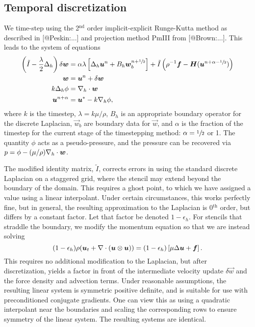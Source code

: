 \subsection{Temporal discretization}

We time-step using the 2$^\text{nd}$ order implicit-explicit Runge-Kutta method
as described in [@Peskin:...] and projection method PmIII from [@Brown:...].
This leads to the system of equations
\begin{align}
    \left(\tilde{I}-\frac{\lambda}2\Delta_h\right)\delta\boldsymbol{w}
    &= \alpha\lambda\left[\Delta_h\boldsymbol{u}^n + B_h \boldsymbol{w}_b^{n+\sfrac12}\right] + \tilde{I}\left(\rho^{-1}\boldsymbol{f} - \boldsymbol{H}(\boldsymbol{u}^{n+\alpha-\sfrac12})\right) \\
    \boldsymbol{w} &= \boldsymbol{u}^n + \delta\boldsymbol{w} \\
    k\Delta_h\phi &= \nabla_h\cdot\boldsymbol{w} \\
    \boldsymbol{u}^{n+\alpha} &= \boldsymbol{u}^\ast - k\nabla_h\phi,
\end{align}
where $k$ is the timestep, $\lambda = k\mu/\rho$, $B_h$ is an appropriate
boundary operator for the discrete Laplacian, $\vec{w}_b$ are boundary data for
$\vec{w}$, and $\alpha$ is the fraction of the timestep for the current stage
of the timestepping method: $\alpha=\sfrac12$ or 1. The quantity $\phi$ acts as
a pseudo-pressure, and the pressure can be recovered via
$p=\phi-(\mu/\rho)\nabla_h\cdot\boldsymbol{w}$.

The modified identity matrix, $\tilde{I}$, corrects errors in using the
standard discrete Laplacian on a staggered grid, where the stencil may extend
beyond the boundary of the domain. This requires a ghost point, to which we
have assigned a value using a linear interpolant. Under certain circumstances,
this works perfectly fine, but in general, the resulting approximation to the
Laplacian is 0$^\text{th}$ order, but differs by a constant factor. Let that
factor be denoted $1-\epsilon_h$. For stencils that straddle the boundary, we
modify the momentum equation so that we are instead solving
\begin{equation}
    (1-\epsilon_h)\rho(\boldsymbol{u}_t + \nabla\cdot(\boldsymbol{u}\otimes\boldsymbol{u})) = (1-\epsilon_h)\left[\mu\Delta\boldsymbol{u} + \boldsymbol{f}\right].
\end{equation}
This requires no additional modification to the Laplacian, but after
discretization, yields a factor in front of the intermediate velocity update
$\delta\vec{w}$ and the force density and advection terms. Under reasonable
assumptions, the resulting linear system is symmetric positive definite, and
is suitable for use with preconditioned conjugate gradients. One can view this
as using a quadratic interpolant near the boundaries and scaling the
corresponding rows to ensure symmetry of the linear system. The resulting
systems are identical.


